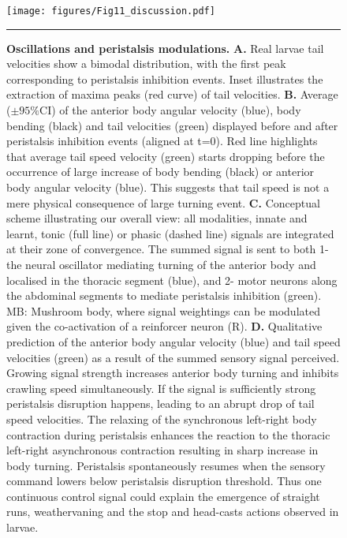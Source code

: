 \documentclass[10pt,a4paper]{article}
\begin{document}
\begin{figure}[!ht]
\begin{center}
\texttt{[image: figures/Fig11\_discussion.pdf]}
\caption{{\bf Oscillations and peristalsis modulations.} {\bf A.} Real larvae tail velocities show a bimodal distribution, with the first peak corresponding to peristalsis inhibition events. Inset illustrates the extraction of maxima peaks (red curve) of tail velocities.
{\bf  B.} Average ($\pm 95\%$CI) of the anterior body angular velocity (blue), body bending (black) and tail velocities (green) displayed before and after peristalsis inhibition events (aligned at t=0). Red line highlights that average tail speed velocity (green) starts dropping before the occurrence of large increase of body bending (black) or anterior body angular velocity (blue). This suggests that tail speed is not a mere physical consequence of large turning event.
{\bf C.} Conceptual scheme illustrating our overall view: all modalities, innate and learnt, tonic (full line) or phasic (dashed line) signals are integrated at their zone of convergence. The summed signal is sent to both 1-the neural oscillator mediating turning of the anterior body and localised in the thoracic segment (blue), and 2- motor neurons along the abdominal segments to mediate peristalsis inhibition (green). MB: Mushroom body, where signal weightings can be modulated given the co-activation of a reinforcer neuron (R).
{\bf D.} Qualitative prediction of the anterior body angular velocity (blue) and tail speed velocities (green) as a result of the summed sensory signal perceived. Growing signal strength increases anterior body turning and inhibits crawling speed simultaneously. If the signal is sufficiently strong peristalsis disruption happens, leading to an abrupt drop of tail speed velocities. The relaxing of the synchronous left-right body contraction during peristalsis enhances the reaction to the thoracic left-right asynchronous contraction resulting in sharp increase in body turning. Peristalsis spontaneously resumes when the sensory command lowers below peristalsis disruption threshold. Thus one continuous control signal could explain the emergence of straight runs, weathervaning and the stop and head-casts actions observed in larvae.
\label{fig:Fig11}}
\hrule
\end{center}
\end{figure}
\end{document}
